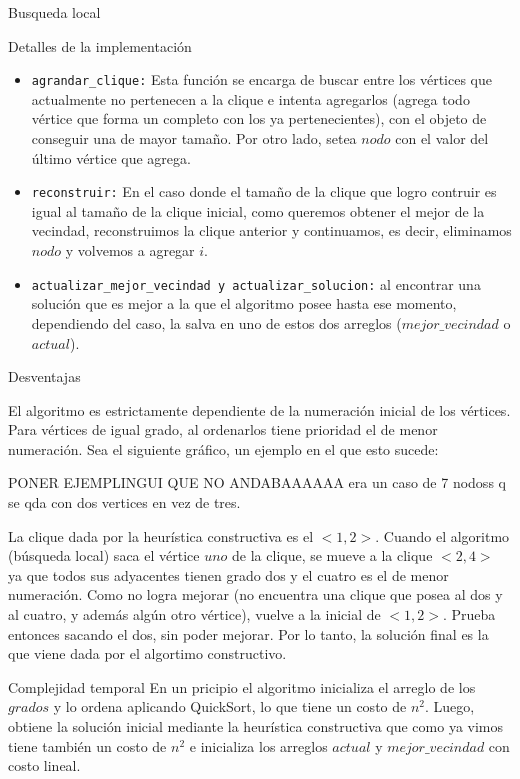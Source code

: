 \begin{section}{Busqueda local}
\begin{subsection}{Detalles de la implementación}
\begin{itemize}
			\item \texttt{agrandar\_clique:} Esta función se encarga de buscar entre los vértices que actualmente no pertenecen a la clique e intenta agregarlos (agrega todo vértice que forma un completo con los ya pertenecientes), con el objeto de conseguir una de mayor tamaño. Por otro lado, setea $nodo$ con el valor del último vértice que agrega.

			\item \texttt{reconstruir:} En el caso donde el tamaño de la clique que logro contruir es igual al tamaño de la clique inicial, como queremos obtener el mejor de la vecindad, reconstruimos la clique anterior y continuamos, es decir, eliminamos $nodo$ y volvemos a agregar $i$.
			
			\item \texttt{actualizar\_mejor\_vecindad y actualizar\_solucion:} al encontrar una solución que es mejor a la que el algoritmo posee hasta ese momento, dependiendo del caso, la salva en uno de estos dos arreglos ($mejor\_vecindad$ o $actual$).
			
		\end{itemize}
		\end{subsection}
		\begin{subsection}{Desventajas}
		
		El algoritmo es estrictamente dependiente de la numeración inicial de los vértices. Para vértices de igual grado, al ordenarlos tiene prioridad el de menor numeración.
		Sea el siguiente gráfico, un ejemplo en el que esto sucede:
		
		
		PONER EJEMPLINGUI QUE NO ANDABAAAAAA era un caso de 7 nodoss q se qda con dos vertices en vez de tres.


		La clique dada por la heurística constructiva es el $<1,2>$.
		Cuando el algoritmo (búsqueda local) saca el vértice $uno$ de la clique, se mueve a la clique $<2,4>$ ya que todos sus adyacentes tienen grado dos y el cuatro es el de menor numeración. Como no logra mejorar (no encuentra una clique que posea al dos y al cuatro, y además algún otro vértice), vuelve a la inicial de $<1,2>$. Prueba entonces sacando el dos, sin poder mejorar. Por lo tanto, la solución final es la que viene dada por el algortimo constructivo.
		
		\end{subsection}
		\begin{subsection}{Complejidad temporal}
			En un pricipio el algoritmo inicializa el arreglo de los $grados$ y lo ordena aplicando QuickSort, lo que tiene un costo de $n^2$. Luego, obtiene la solución inicial mediante la heurística constructiva que como ya vimos tiene también un costo de $n^2$ e inicializa los arreglos $actual$ y $mejor\_vecindad$ con costo lineal.


\end{subsection}
\end{section}
